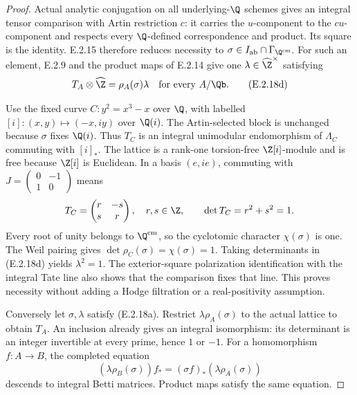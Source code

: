\begin{proof}
Actual analytic conjugation on all underlying-\(\Q\) schemes
gives an integral tensor comparison with Artin restriction \(c\):
it carries the \(u\)-component to the \(cu\)-component and
respects every \(\Q\)-defined correspondence and product.
Its square is the identity. E.2.15 therefore reduces necessity
to \(\sigma\in I_{\mathrm{ab}}\cap\Gamma_{\Q^{\mathrm{cm}}}\).
For such an element, E.2.9 and the product maps of E.2.14 give
one \(\lambda\in\widehat\Z^\times\) satisfying
\[
 T_A\otimes\widehat\Z=\rho_A(\sigma)\lambda
 \quad\text{for every }A/\Qb.
 \tag{E.2.18d}
\]

Use the fixed curve \(C:y^2=x^3-x\) over \(\Q\), with labelled
\([i]:(x,y)\mapsto(-x,iy)\) over \(\Q(i)\).
The Artin-selected block is unchanged because \(\sigma\)
fixes \(\Q(i)\). Thus \(T_C\) is an integral unimodular
endomorphism of \(\Lambda_C\) commuting with \([i]_*\).
The lattice is a rank-one torsion-free \(\Z[i]\)-module and
is free because \(\Z[i]\) is Euclidean. In a basis \((e,ie)\),
commuting with \(J=\left(\begin{smallmatrix}0&-1\\1&0\end{smallmatrix}\right)\)
means
\[
 T_C=\begin{pmatrix}r&-s\\s&r\end{pmatrix},
 \quad r,s\in\Z,\qquad
 \det T_C=r^2+s^2=1.
\]
Every root of unity belongs to \(\Q^{\mathrm{cm}}\), so
the cyclotomic character \(\chi(\sigma)\) is one.
The Weil pairing gives
\(\det\rho_C(\sigma)=\chi(\sigma)=1\).
Taking determinants in (E.2.18d) yields \(\lambda^2=1\).
The exterior-square polarization identification with the
integral Tate line also shows that the comparison fixes
that line. This proves necessity without adding a Hodge
filtration or a real-positivity assumption.

Conversely let \(\sigma,\lambda\) satisfy (E.2.18a).
Restrict \(\lambda\rho_A(\sigma)\) to the actual lattice
to obtain \(T_A\). An inclusion already gives an integral
isomorphism: its determinant is an integer invertible at
every prime, hence \(1\) or \(-1\).
For a homomorphism \(f:A\to B\), the completed equation
\[
 (\lambda\rho_B(\sigma))f_*
       =(\sigma f)_*(\lambda\rho_A(\sigma))
\]
descends to integral Betti matrices. Product maps satisfy
the same equation.


\end{proof}
